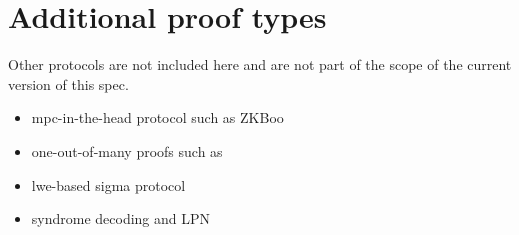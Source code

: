 \documentclass[11pt]{article}
\begin{document}

\section{Additional proof types}

Other protocols are not included here and are not part of the scope of the current version of this spec.
\begin{itemize}
\item mpc-in-the-head protocol such as ZKBoo~\cite{USENIX:GiaMadOrl16}
\item one-out-of-many proofs such as~\cite{EC:GroKoh15}
\item lwe-based sigma protocol~\cite{C:AttCraKoh21}
\item syndrome decoding and LPN~\cite{C:Stern93,AC:JKPT12}
\end{itemize}



\end{document}
